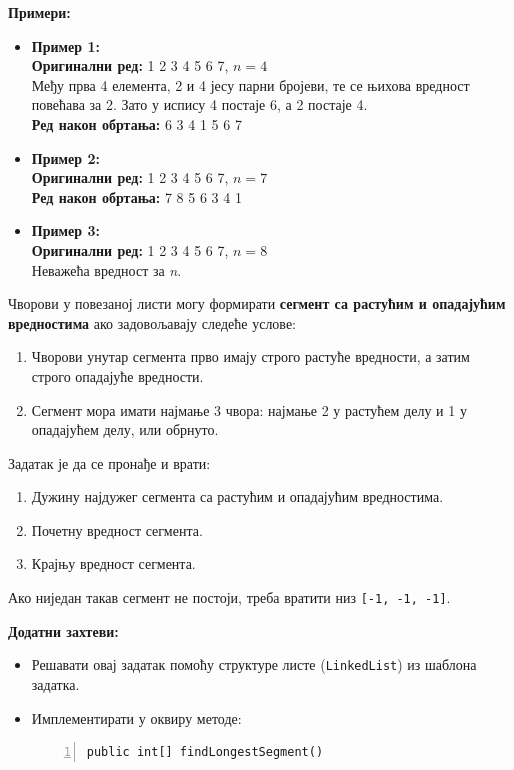 \textbf{Примери:}
\begin{itemize}
    \item \textbf{Пример 1:} \\
          \textbf{Оригинални ред:} 1 2 3 4 5 6 7, $n = 4$ \\
          Међу прва 4 елемента, 2 и 4 јесу парни бројеви, те се њихова вредност повећава за 2. Зато у испису 4 постаје 6, а 2 постаје 4. \\
          \textbf{Ред након обртања:} 6 3 4 1 5 6 7
    \item \textbf{Пример 2:} \\
          \textbf{Оригинални ред:} 1 2 3 4 5 6 7, $n = 7$ \\
          \textbf{Ред након обртања:} 7 8 5 6 3 4 1
    \item \textbf{Пример 3:} \\
          \textbf{Оригинални ред:} 1 2 3 4 5 6 7, $n = 8$ \\
          Неважећа вредност за \textit{n}.
\end{itemize}



Чворови у повезаној листи могу формирати \textbf{сегмент са растућим и опадајућим вредностима} ако задовољавају следеће услове:
\begin{enumerate}
    \item Чворови унутар сегмента прво имају строго растуће вредности, а затим строго опадајуће вредности.
    \item Сегмент мора имати најмање 3 чвора: најмање 2 у растућем делу и 1 у опадајућем делу, или обрнуто.
\end{enumerate}

Задатак је да се пронађе и врати:
\begin{enumerate}
    \item Дужину најдужег сегмента са растућим и опадајућим вредностима.
    \item Почетну вредност сегмента.
    \item Крајњу вредност сегмента.
\end{enumerate}

Ако ниједан такав сегмент не постоји, треба вратити низ \texttt{[-1, -1, -1]}.

\textbf{Додатни захтеви:}
\begin{itemize}
    \item Решавати овај задатак помоћу структуре листе (\texttt{LinkedList}) из шаблона задатка.
    \item Имплементирати у оквиру методе:
    \begin{Verbatim}[fontsize=\footnotesize, numbers=left, xleftmargin=10mm]
public int[] findLongestSegment()
    \end{Verbatim}
\end{itemize}

